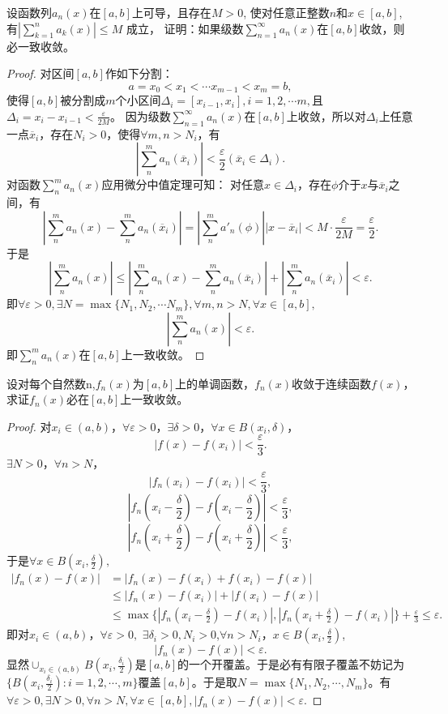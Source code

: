 \begin{exercise}
设函数列${a_n(x)}$在$[a,b]$上可导，且存在$M>0$,
使对任意正整数$n$和$x\in[a,b]$,
有$|\sum_{k=1}^na_k(x)|\leq M$ 成立，
证明：如果级数$\sum_{n=1}^{\infty}a_n(x)$在$[a,b]$收敛，则必一致收敛。
  \end{exercise}  

  \begin{proof}
    对区间$[a,b]$作如下分割：
  $$a=x_0<x_1<\cdots x_{m-1}<x_m=b,$$
  使得$[a,b]$被分割成$m$个小区间$\Delta_i=[x_{i-1},x_i],i=1,2,\cdots m,$且$\Delta_i=x_i-x_{i-1}<\frac{\varepsilon}{2M}$。
  因为级数$\sum_{n=1}^{\infty}a_n(x)$在$[a,b]$上收敛，所以对$\Delta_i$上任意一点$\overline{x}_i$，存在$N_i>0$，使得$\forall m,n>N_i$，有$$|\sum_n^ma_n(\overline{x}_i)|<\frac{\varepsilon}{2}(\overline{x}_i\in\Delta_i).$$
  对函数$\sum_n^ma_n(x)$应用微分中值定理可知：
  对任意$x\in\Delta_i$，存在$\phi$介于$x$与$\overline{x}_i$之间，有$$|\sum_n^ma_n(x)-\sum_n^ma_n(\overline{x}_i)|=|\sum_n^ma'_n(\phi)||x-\overline{x}_i|<M\cdot\frac{\varepsilon}{2M}=\frac{\varepsilon}{2}.$$
  于是$$|\sum_n^ma_n(x)|\leq|\sum_n^ma_n(x)-\sum_n^ma_n(\overline{x}_i)|+|\sum_n^ma_n(\overline{x}_i)|<\varepsilon.$$
  即$\forall\varepsilon>0,\exists N=\max\{N_1,N_2,\cdots N_m\},\forall m,n>N,\forall x\in[a,b],$$$|\sum_n^ma_n(x)|<\varepsilon.$$
  即$\sum_n^ma_n(x)$在$[a,b]$上一致收敛。
  \end{proof}

  \begin{exercise}
  设对每个自然数n,$f_n(x)$为$[a,b]$上的单调函数，${f_n(x)}$收敛于连续函数$f(x)$，求证${f_n(x)}$必在$[a,b]$上一致收敛。
  \end{exercise}

  \begin{proof}
    对$x_i\in(a,b)$，$\forall\varepsilon>0$，$\exists\delta>0$，$\forall x\in B(x_i,\delta)$，
  $$|f(x)-f(x_i)|<\frac{\varepsilon}3.$$
  $\exists N>0$，$\forall n>N$，
  $$|f_n(x_i)-f(x_i)|<\frac{\varepsilon}{3},$$
  $$|f_n(x_i-\frac{\delta}{2})-f(x_i-\frac{\delta}{2})|<\frac{\varepsilon}{3},$$
  $$|f_n(x_i+\frac{\delta}{2})-f(x_i+\frac{\delta}{2})|<\frac{\varepsilon}{3},$$
  于是$\forall x\in B(x_i,\frac{\delta}{2}),$
  \begin{align*}
  |f_n(x)-f(x)|&=|f_n(x)-f(x_i)+f(x_i)-f(x)|\\
  &\leq|f_n(x)-f(x_i)|+|f(x_i)-f(x)|\\
  &\leq\max\{|f_n(x_i-\frac{\delta}{2})-f(x_i)|,|f_n(x_i+\frac{\delta}{2})-f(x_i)|\}+\frac{\varepsilon}{3}
  \leq\varepsilon.
  \end{align*}
  即对$x_i\in(a,b)$，$\forall\varepsilon>0,$ $\exists\delta_i>0,N_i>0$,$\forall n>N_i$，$x\in B(x_i,\frac{\delta}{2})$,
  $$|f_n(x)-f(x)|<\varepsilon.$$
  显然$\cup_{x_i\in(a,b)}B(x_i,\frac{\delta_i}{2})$是$[a,b]$的一个开覆盖。于是必有有限子覆盖不妨记为$\{B(x_i,\frac{\delta_i}{2}):i=1,2,\cdots,m\}$覆盖$[a,b]$。于是取$N=\max\{N_1,N_2,\cdots,N_m\}$。有$\forall\varepsilon>0,\exists N>0,\forall n>N,\forall x\in[a,b],|f_n(x)-f(x)|<\varepsilon.$    
  \end{proof}

